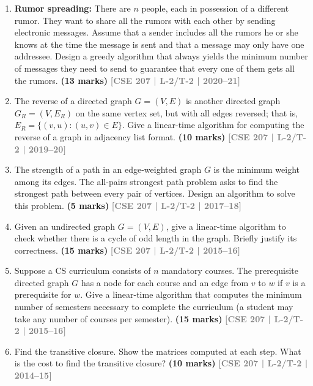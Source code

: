 \documentclass[12pt,a3paper]{article}
\newcommand{\yr}[1]{\hfill\textcolor{gray}{\small\textbf{[#1]}}}
\newcommand{\mk}[1]{\textcolor{orange!70!black}{\small\textbf{(#1 marks)}}}
\begin{document}
\begin{enumerate}
\item \textbf{Rumor spreading:} There are $n$ people, each in possession of a different rumor. They want to share all the rumors with each other by sending electronic messages. Assume that a sender includes all the rumors he or she knows at the time the message is sent and that a message may only have one addressee. Design a greedy algorithm that always yields the minimum number of messages they need to send to guarantee that every one of them gets all the rumors.
\mk{13} \yr{CSE 207 | L-2/T-2 | 2020--21}


\item The reverse of a directed graph $G = (V, E)$ is another directed graph $G_R = (V, E_R)$ on the same vertex set, but with all edges reversed; that is, $E_R = \{(v, u) : (u, v) \in E\}$. Give a linear-time algorithm for computing the reverse of a graph in adjacency list format.
\mk{10} \yr{CSE 207 | L-2/T-2 | 2019--20}


\item The strength of a path in an edge-weighted graph $G$ is the minimum weight among its edges. The all-pairs strongest path problem asks to find the strongest path between every pair of vertices. Design an algorithm to solve this problem. \mk{5}
\yr{CSE 207 | L-2/T-2 | 2017--18}

\item Given an undirected graph $G = (V, E)$, give a linear-time algorithm to check whether there is a cycle of odd length in the graph. Briefly justify its correctness. \mk{15}
\yr{CSE 207 | L-2/T-2 | 2015--16}

\item Suppose a CS curriculum consists of $n$ mandatory courses. The prerequisite directed graph $G$ has a node for each course and an edge from $v$ to $w$ if $v$ is a prerequisite for $w$. Give a linear-time algorithm that computes the minimum number of semesters necessary to complete the curriculum (a student may take any number of courses per semester). \mk{15}
\yr{CSE 207 | L-2/T-2 | 2015--16}

\item Find the transitive closure. Show the matrices computed at each step. What is the cost to find the transitive closure? \mk{10}
\yr{CSE 207 | L-2/T-2 | 2014--15}

\begin{center}
\end{center}
\end{enumerate}
\end{document}
